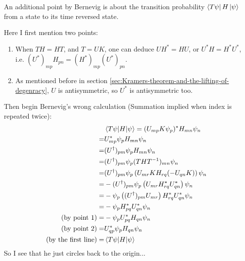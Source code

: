 \documentclass{article}
\numberwithin{equation}{subsection} %
\theoremstyle{definition}
\begin{document}
        An additional point by Bernevig is about the transition probability
        $\bra{T \psi}H\ket{\psi}$ from a state to its time reversed
        state.

        Here I first mention two points:
        \begin{enumerate}
            \item When $T H=HT$, and $T=UK$, one can deduce
                $UH^* = HU$, or $U^*H=H^*U^*$, i.e.
                $(U^*)_{mp}H_{pn}=(H^*)_{mp}(U^*)_{pn}$.
            \item As mentioned before in section
                \ref{sec:Kramers-theorem-and-the-lifting-of-degenracy},
                $U$ is antisymmetric, so $U^*$ is antisymmetric too.
        \end{enumerate}

        Then begin Bernevig's wrong calculation (Summation implied when
        index is repeated twice):
        \begin{align}
            & \braket{T\psi|H|\psi} = (U_{mp}K\psi_p)^*H_{mn}\psi_n 
            \nonumber\\
            =& U_{mp}^* \psi_p H_{mn} \psi_n 
            \nonumber\\
            =& (U^\dagger)_{pm}\psi_p H_{mn}\psi_n 
            \label{eq:TRoper.Kramer.bernevig1}
            \\
            =& (U^\dagger)_{pm}\psi_p (THT^{-1})_{mn} \psi_n 
            \nonumber\\       
            =& (U^\dagger)_{pm}\psi_p \left(U_{mr}KH_{rq}(-U_{qn}K)\right)
                \psi_n
            \nonumber\\       
            =& - (U^\dagger)_{pm}\psi_p \left(U_{mr}H^*_{rq}U^*_{qn}\right)
                \psi_n
            \nonumber\\       
            =& - \psi_p \left((U^\dagger)_{pm}
                U_{mr}\right)H^*_{rq}U^*_{qn}\psi_n
            \nonumber\\       
            =& - \psi_p H^*_{pq}U^*_{qn}\psi_n
            \nonumber\\       
            \text{(by point 1)}=& - \psi_p U^*_{pq}H_{qn}\psi_n 
            \nonumber\\       
            \text{(by point 2)}=& U^*_{qp}\psi_p H_{qn} \psi_n 
            \nonumber\\       
            \text{(by the first line)}=& \braket{T\psi|H|\psi}
        \end{align}
        So I see that he just circles back to the origin...
\end{document}
